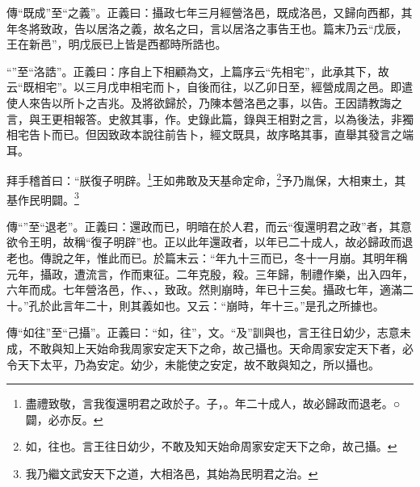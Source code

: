 {\noindent\zhuan{}\fzbyks 傳“既成”至“之義”。正義曰：攝政七年三月經營洛邑，既成洛邑，又歸向西都，其年冬將致政，告以居洛之義，故名之曰，言以居洛之事告王也。篇末乃云“戊辰，王在新邑”，明戊辰已上皆是西都時所誥也。 \par}

{\noindent\shu{}\fzkt “”至“洛誥”。正義曰：序自上下相顧為文，上篇序云“先相宅”，此承其下，故云“既相宅”。以三月戊申相宅而卜，自後而往，以乙卯日至，經營成周之邑。即遣使人來告以所卜之吉兆。及將欲歸於，乃陳本營洛邑之事，以告。王因請教誨之言，與王更相報答。史敘其事，作。史錄此篇，錄與王相對之言，以為後法，非獨相宅告卜而已。但因致政本說往前告卜，經文既具，故序略其事，直舉其發言之端耳。 \par}

拜手稽首曰：“朕復子明辟。\footnote{盡禮致敬，言我復還明君之政於子。子，。年二十成人，故必歸政而退老。○闢，必亦反。}王如弗敢及天基命定命，\footnote{如，往也。言王往日幼少，不敢及知天始命周家安定天下之命，故己攝。}予乃胤保，大相東土，其基作民明闢。\footnote{我乃繼文武安天下之道，大相洛邑，其始為民明君之治。}


{\noindent\zhuan{}\fzbyks 傳“”至“退老”。正義曰：還政而已，明暗在於人君，而云“復還明君之政”者，其意欲令王明，故稱“復子明辟”也。正以此年還政者，以年已二十成人，故必歸政而退老也。傳說之年，惟此而已。於篇末云：“年九十三而已，冬十一月崩。其明年稱元年，攝政，遭流言，作而東征。二年克殷，殺。三年歸，制禮作樂，出入四年，六年而成。七年營洛邑，作、、，致政。然則崩時，年已十三矣。攝政七年，適滿二十。”孔於此言年二十，則其義如也。又云：“崩時，年十三。”是孔之所據也。 \par}

{\noindent\zhuan{}\fzbyks 傳“如往”至“己攝”。正義曰：“如，往”，文。“及”訓與也，言王往日幼少，志意未成，不敢與知上天始命我周家安定天下之命，故己攝也。天命周家安定天下者，必令天下太平，乃為安定。幼少，未能使之安定，故不敢與知之，所以攝也。 \par}

